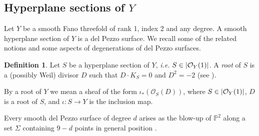 \documentclass[11pt]{amsart}
\theoremstyle{definition}
\newtheorem{definition}[thm]{Definition}
\newcommand{\pr}[1]{\mathbb P^{#1}}
\newcommand{\sO}{\mathcal{O}}
\newcommand{\AAA}[1]{\textcolor{red}{#1}}
\DeclarePairedDelimiter{\set}{\lbrace}{\rbrace}
\DeclarePairedDelimiter{\abs}{\lvert}{\rvert}
\begin{document}


\subsection{Hyperplane sections of $Y$}\label{sec_hyperplane sections+generality}



Let $Y$ be a smooth Fano threefold of rank 1, index 2 and any degree. A smooth hyperplane section of $Y$ is a del Pezzo surface. We recall some of the related notions and some aspects of degenerations of del Pezzo surfaces. 

\begin{definition}\label{def_of_root_of_S}
Let $S$ be a hyperplane section of $Y$, \textit{i.e.} $S\in \abs{\sO_Y(1)}$. A \textit{root} of $S$ is a (possibly Weil) divisor $D$ such that $D\cdot K_S=0$ and $D^2=-2$ (see \cite[\S 8.2.3]{Dol12}).

By a root of $Y$ we mean a sheaf of the form  $\iota_*(\sO_S(D))$, where $S\in \abs{\sO_Y(1)}$, $D$ is a root of $S$, and $\iota\colon S\to Y$ is the inclusion map.
\end{definition}

Every smooth del Pezzo surface of degree $d$ arises as the blow-up of $\pr 2$ along a set $\Sigma$ containing $9-d$ points in general position \cite[Proposition~8.1.25]{Dol12}. %

\end{document}
